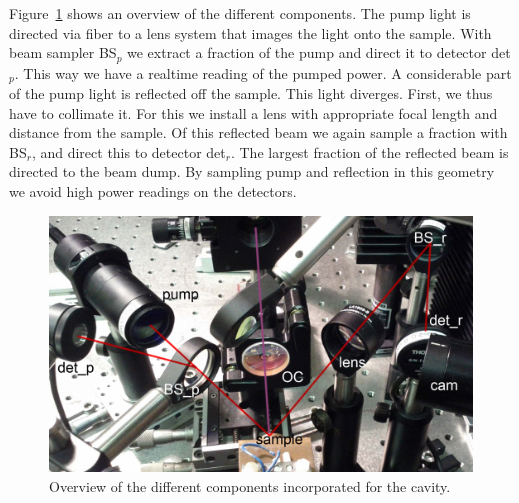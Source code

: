 Figure~\ref{img:overview} shows an overview of the different components.
The pump light is directed via fiber to a lens system that images the light onto the sample.
With beam sampler BS$_p$ we extract a fraction of the pump and direct it to detector det$_p$.
This way we have a realtime reading of the pumped power.
A considerable part of the pump light is reflected off the sample.
This light diverges.
First, we thus have to collimate it.
For this we install a lens with appropriate focal length and distance from the sample.
Of this reflected beam we again sample a fraction with BS$_r$,
and direct this to detector det$_r$.
The largest fraction of the reflected beam is directed to the beam dump.
By sampling pump and reflection in this geometry
we avoid high power readings on the detectors.

\begin{figure}
\centering
\includegraphics[width=12.5cm]{img/appendix/cavity_all.jpg}
\caption{Overview of the different components incorporated for the cavity.}
\label{img:overview}
\end{figure}




